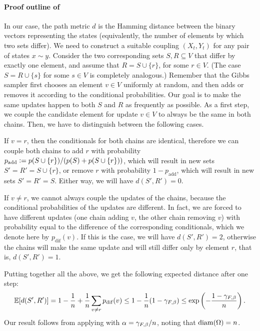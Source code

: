 \paragraph{Proof outline of }
In our case, the path metric $d$ is the Hamming distance between the binary vectors representing the states (equivalently, the number of elements by which two sets differ).
We need to construct a suitable coupling $(X_t, Y_t)$ for any pair of states $x \sim y$.
Consider the two corresponding sets $S, R \subseteq V$ that differ by exactly one element, and assume that $R = S \cup \{r\}$, for some $r \in V$. (The case $S = R \cup \{s\}$ for some $s \in V$ is completely analogous.)
Remember that the Gibbs sampler first chooses an element $v \in V$ uniformly at random, and then adds or removes it according to the conditional probabilities.
Our goal is to make the same updates happen to both $S$ and $R$ as frequently as possible.
As a first step, we couple the candidate element for update $v \in V$ to always be the same in both chains.
Then, we have to distinguish between the following cases.

If $v = r$, then the conditionals for both chains are identical, therefore we can couple both chains to add $r$ with probability $p_{\mathrm{add}} \defeq p(S \cup \{r\}) / (p(S) + p(S \cup \{r\}))$, which will result in new sets $S' = R' = S \cup \{r\}$, or remove $r$ with probability $1 - p_{\mathrm{add}}$, which will result in new sets $S' = R' = S$.
Either way, we will have $d(S', R') = 0$.
  
If $v \neq r$, we cannot always couple the updates of the chains, because the conditional probabilities of the updates are different.
In fact, we are forced to have different updates (one chain adding $v$, the other chain removing $v$) with probability equal to the difference of the corresponding conditionals, which we denote here by $p_{\mathrm{dif}}(v)$.
If this is the case, we will have $d(S', R') = 2$, otherwise the chains will make the same update and will still differ only by element $r$, that is, $d(S', R') = 1$.
  
Putting together all the above, we get the following expected distance after one step:
\begin{align*}
  \E[d(S', R')] = 1 -\frac{1}{n} + \frac{1}{n}\sum_{v \neq r}p_{\mathrm{dif}}(v) \leq 1 - \frac{1}{n}(1 - \gf) \leq \exp\left(-\frac{1-\gf}{n}\right).
\end{align*}
Our result follows from applying  with $\alpha = \gf/n$, noting that $\mathrm{diam}(\ss) = n$.

